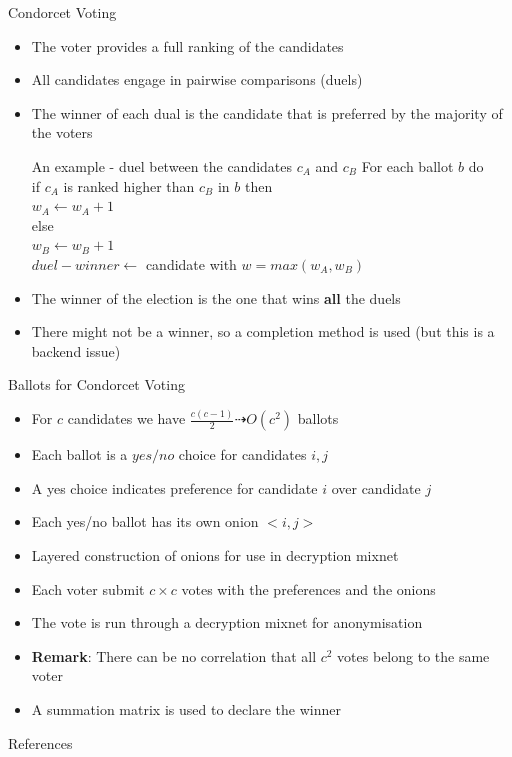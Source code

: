 \documentclass{beamer}
\begin{document}
\begin{frame}{Condorcet Voting}
\begin{itemize}
\item The voter provides a full ranking of the candidates
\item All candidates engage in pairwise comparisons (duels)
\item The winner of each dual is the candidate that is preferred by the majority of the voters 
\begin{block}{An example - duel between the candidates $c_A$ and $c_B$}
For each ballot $b$ do \\
\hspace{10mm}	 if $c_A$ is ranked higher than $c_B$ in $b$ then \\
\hspace{20mm}		 	$w_A \leftarrow w_A + 1$ \\
\hspace{10mm} 	 else \\
\hspace{20mm}    $w_B \leftarrow w_B + 1$ \\
$duel-winner \leftarrow$ candidate with $w=max(w_A,w_B)$
\end{block}
\item The winner of the election is the one that wins \textbf{all} the duels
\item There might not be a winner, so a completion method is used (but this is a backend issue)
\end{itemize}
\end{frame} 

\begin{frame}{Ballots for Condorcet Voting \cite{Clarkson05}}
\begin{itemize}
\item For $c$ candidates we have $\frac{c (c-1)}{2} \dashrightarrow O(c^2)$ ballots
\item Each ballot is a $yes/no$ choice for candidates $i,j$
\item A yes choice indicates preference for candidate $i$ over candidate $j$
\item Each yes/no ballot has its own onion $<i,j>$
\item Layered construction of onions for use in decryption mixnet
\item Each voter submit   $c \times c$ votes with the preferences and the onions
\item The vote is run through a decryption mixnet for anonymisation
\item \textbf{Remark}: There can be no correlation that all $c^2$ votes belong to the same voter
\item A summation matrix is used to declare the winner 
\end{itemize}
\end{frame}

\begin{frame}[allowframebreaks]{References}
\begin{tiny}
\nocite{*}


\end{tiny}
\end{frame}

 
\end{document}
